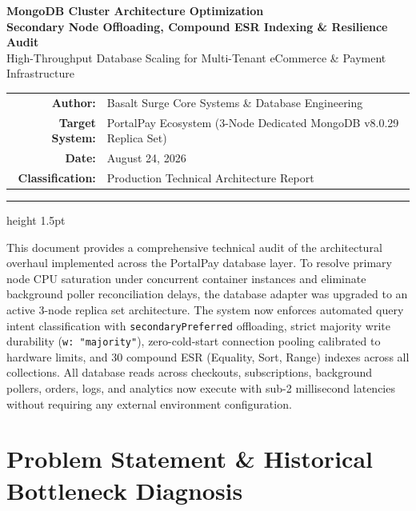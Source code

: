 \documentclass[11pt,a4paper]{article}
\begin{document}
\begin{center}
    {\Huge\bfseries\color{primary} MongoDB Cluster Architecture Optimization}\\[0.4em]
    {\Large\bfseries\color{secondary} Secondary Node Offloading, Compound ESR Indexing \& Resilience Audit}\\[0.8em]
    {\normalsize\color{darkgray} High-Throughput Database Scaling for Multi-Tenant eCommerce \& Payment Infrastructure}\\[1.2em]
    
    \begin{tabular}{rl}
        \textbf{Author:} & Basalt Surge Core Systems \& Database Engineering \\
        \textbf{Target System:} & PortalPay Ecosystem (3-Node Dedicated MongoDB v8.0.29 Replica Set) \\
        \textbf{Date:} & August 24, 2026 \\
        \textbf{Classification:} & Production Technical Architecture Report \\
    \end{tabular}
\end{center}

\vspace{0.5em}
\hrule height 1.5pt
\vspace{1.0em}

\begin{summarybox}
This document provides a comprehensive technical audit of the architectural overhaul implemented across the PortalPay database layer. To resolve primary node CPU saturation under concurrent container instances and eliminate background poller reconciliation delays, the database adapter was upgraded to an active 3-node replica set architecture. The system now enforces automated query intent classification with \texttt{secondaryPreferred} offloading, strict majority write durability (\texttt{w: "majority"}), zero-cold-start connection pooling calibrated to hardware limits, and 30 compound ESR (Equality, Sort, Range) indexes across all collections. All database reads across checkouts, subscriptions, background pollers, orders, logs, and analytics now execute with sub-2 millisecond latencies without requiring any external environment configuration.
\end{summarybox}

\section{Problem Statement \& Historical Bottleneck Diagnosis}
\end{document}
